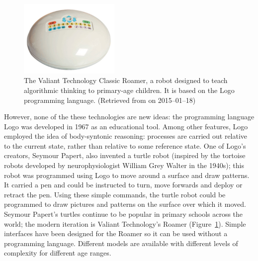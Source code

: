     \begin{figure}
      \begin{center}
        \includegraphics[width=0.43\textwidth]{Files/valiant_roamer.pdf}
      \end{center}
      \caption{The Valiant Technology Classic Roamer, a robot designed to teach algorithmic thinking to primary-age children. It is based on the Logo programming language. \small (Retrieved from  on 2015--01--18)}
      \label{fig: valiant roamer}
    \end{figure}
    However, none of the these technologies are new ideas: the programming language Logo was developed in 1967 as an educational tool. Among other features, Logo employed the idea of body-syntonic reasoning: processes are carried out relative to the current state, rather than relative to some reference state. One of Logo's creators, Seymour Papert, also invented a turtle robot (inspired by the tortoise robots developed by neurophysiologist William Grey Walter in the 1940s); this robot was programmed using Logo to move around a surface and draw patterns. It carried a pen and could be instructed to turn, move forwards and deploy or retract the pen. Using these simple commands, the turtle robot could be programmed to draw pictures and patterns on the surface over which it moved.\\
    Seymour Papert's turtles continue to be popular in primary schools across the world; the modern iteration is Valiant Technology's Roamer (Figure~\ref{fig: valiant roamer}).\cite{valiantroamer} Simple interfaces have been designed for the Roamer so it can be used without a programming language. Different models are available with different levels of complexity for different age ranges.
